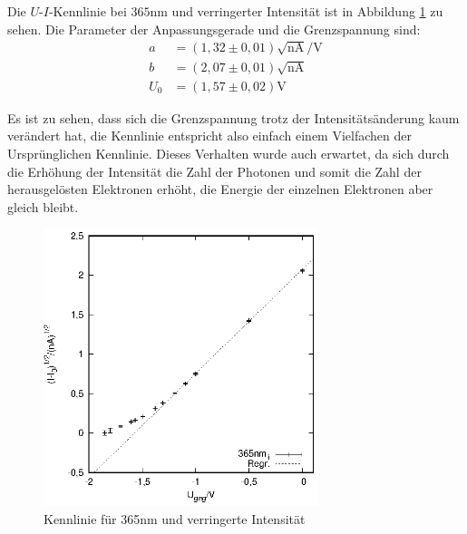 Die $U$-$I$-Kennlinie bei $365$nm und verringerter Intensität ist in Abbildung \ref{fig:lowintensity} zu sehen. Die Parameter der Anpassungsgerade und die Grenzspannung sind:
\begin{align*}
  a&=(1,32 \pm 0,01)\sqrt{\mathrm{nA}}/\mathrm{V}\\
  b&=(2,07 \pm 0,01)\sqrt{\mathrm{nA}}\\
  U_0&=(1,57 \pm 0,02)\mathrm{V}   
\end{align*}

Es ist zu sehen, dass sich die Grenzspannung trotz der Intensitätsänderung kaum verändert hat, die Kennlinie entspricht also einfach einem Vielfachen der Ursprünglichen Kennlinie. Dieses Verhalten wurde auch erwartet, da sich durch die Erhöhung der Intensität die Zahl der Photonen und somit die Zahl der herausgelösten Elektronen erhöht, die Energie der einzelnen Elektronen aber gleich bleibt.

\begin{figure}[h]
  \centering
  \includegraphics[width=8cm]{data/Messung_photoeffekt/365nm_low_intensity.eps}
  \caption{Kennlinie für 365nm und verringerte Intensität}
  \label{fig:lowintensity}
\end{figure}
